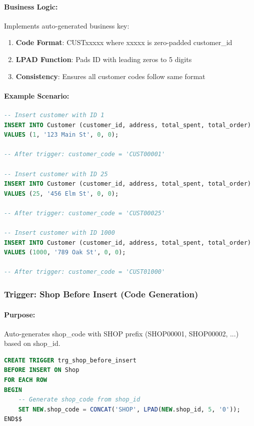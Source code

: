 \paragraph{Business Logic:}
Implements auto-generated business key:
\begin{enumerate}
    \item \textbf{Code Format}: CUSTxxxxx where xxxxx is zero-padded customer\_id
    \item \textbf{LPAD Function}: Pads ID with leading zeros to 5 digits
    \item \textbf{Consistency}: Ensures all customer codes follow same format
\end{enumerate}

\paragraph{Example Scenario:}

\begin{lstlisting}[language=SQL]
-- Insert customer with ID 1
INSERT INTO Customer (customer_id, address, total_spent, total_order)
VALUES (1, '123 Main St', 0, 0);

-- After trigger: customer_code = 'CUST00001'

-- Insert customer with ID 25
INSERT INTO Customer (customer_id, address, total_spent, total_order)
VALUES (25, '456 Elm St', 0, 0);

-- After trigger: customer_code = 'CUST00025'

-- Insert customer with ID 1000
INSERT INTO Customer (customer_id, address, total_spent, total_order)
VALUES (1000, '789 Oak St', 0, 0);

-- After trigger: customer_code = 'CUST01000'
\end{lstlisting}

\subsubsection{Trigger: Shop Before Insert (Code Generation)}

\paragraph{Purpose:} Auto-generates shop\_code with SHOP prefix (SHOP00001, SHOP00002, ...) based on shop\_id.

\begin{lstlisting}[language=SQL, caption=Trigger: trg\_shop\_before\_insert, label=lst:trg_shop_before]
CREATE TRIGGER trg_shop_before_insert
BEFORE INSERT ON Shop
FOR EACH ROW
BEGIN
    -- Generate shop_code from shop_id
    SET NEW.shop_code = CONCAT('SHOP', LPAD(NEW.shop_id, 5, '0'));
END$$
\end{lstlisting}

